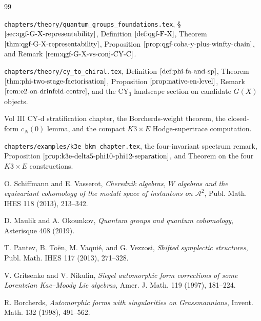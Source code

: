\documentclass[11pt]{amsart}
\theoremstyle{definition}
\begin{document}
\begin{thebibliography}{99}

\texttt{chapters/theory/quantum\_groups\_foundations.tex},
\S\(\ref{sec:qgf-G-X-representability}\), Definition
\(\ref{def:qgf-F-X}\), Theorem
\(\ref{thm:qgf-G-X-representability}\), Proposition
\(\ref{prop:qgf-coha-y-plus-winfty-chain}\), and Remark
\(\ref{rem:qgf-G-X-vs-conj-CY-C}\).

\texttt{chapters/theory/cy\_to\_chiral.tex},
Definition \(\ref{def:phi-fa-and-sp}\), Theorem
\(\ref{thm:phi-two-stage-factorisation}\), Proposition
\(\ref{prop:native-en-level}\), Remark
\(\ref{rem:e2-on-drinfeld-centre}\), and the CY\(_3\) landscape
section on candidate \(G(X)\) objects.

Vol III CY-d stratification chapter, the Borcherds-weight theorem, the
closed-form \(c_N(0)\) lemma, and the compact \(K3\times E\)
Hodge-supertrace computation.

\texttt{chapters/examples/k3e\_bkm\_chapter.tex},
the four-invariant spectrum remark, Proposition
\(\ref{prop:k3e-delta5-phi10-phi12-separation}\), and Theorem
on the four \(K3\times E\) constructions.

O. Schiffmann and E. Vasserot,
\emph{Cherednik algebras, \(W\) algebras and the equivariant
cohomology of the moduli space of instantons on \(\mathcal A^2\)},
Publ. Math. IHES 118 (2013), 213--342.

D. Maulik and A. Okounkov,
\emph{Quantum groups and quantum cohomology},
Asterisque 408 (2019).

T. Pantev, B. To\"en, M. Vaqui\'e, and G. Vezzosi,
\emph{Shifted symplectic structures},
Publ. Math. IHES 117 (2013), 271--328.

V. Gritsenko and V. Nikulin,
\emph{Siegel automorphic form corrections of some Lorentzian
Kac--Moody Lie algebras},
Amer. J. Math. 119 (1997), 181--224.

R. Borcherds,
\emph{Automorphic forms with singularities on Grassmannians},
Invent. Math. 132 (1998), 491--562.

\end{thebibliography}
\end{document}
